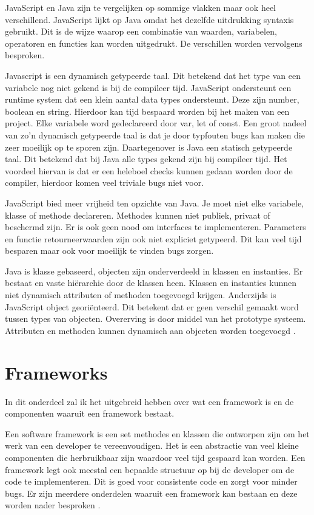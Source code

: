JavaScript en Java zijn te vergelijken op sommige vlakken maar ook heel verschillend. JavaScript lijkt op Java omdat het dezelfde uitdrukking syntaxis gebruikt. Dit is de wijze waarop een combinatie van waarden, variabelen, operatoren en functies kan worden uitgedrukt. De verschillen worden vervolgens besproken.

Javascript is een dynamisch getypeerde taal. Dit betekend dat het type van een variabele nog niet gekend is bij de compileer tijd. JavaScript ondersteunt een runtime system dat een klein aantal data types ondersteunt. Deze zijn number, boolean en string. Hierdoor kan tijd bespaard worden bij het maken van een project. Elke variabele word gedeclareerd door var, let of const. Een groot nadeel van zo’n dynamisch getypeerde taal is dat je door typfouten bugs kan maken die zeer moeilijk op te sporen zijn. Daartegenover is Java een statisch getypeerde taal. Dit betekend dat bij Java alle types gekend zijn bij compileer tijd. Het voordeel hiervan is dat er een heleboel checks kunnen gedaan worden door de compiler, hierdoor komen veel triviale bugs niet voor.

JavaScript bied meer vrijheid ten opzichte van Java. Je moet niet elke variabele, klasse of methode declareren. Methodes kunnen niet publiek, privaat of beschermd zijn. Er is ook geen nood om interfaces te implementeren. Parameters en functie retourneerwaarden zijn ook niet expliciet getypeerd. Dit kan veel tijd besparen maar ook voor moeilijk te vinden bugs zorgen.

Java is klasse gebaseerd, objecten zijn onderverdeeld in klassen en instanties. Er bestaat en vaste hiërarchie door de klassen heen. Klassen en instanties kunnen niet dynamisch attributen of methoden toegevoegd krijgen. Anderzijds is JavaScript object georiënteerd. Dit betekent dat er geen verschil gemaakt word tussen types van objecten. Overerving is door middel van het prototype systeem. Attributen en methoden kunnen dynamisch aan objecten worden toegevoegd \autocite{Introduction_2018}.

\section{Frameworks}
\label{sec:Frameworks}

In dit onderdeel zal ik het uitgebreid hebben over wat een framework is en de componenten waaruit een framework bestaat.

Een software framework is een set methodes en klassen die ontworpen zijn om het werk van een developer te vereenvoudigen. Het is een abstractie van veel kleine componenten die herbruikbaar zijn waardoor veel tijd gespaard kan worden. Een framework legt ook meestal een bepaalde structuur op bij de developer om de code te implementeren. Dit is goed voor consistente code en zorgt voor minder bugs. Er zijn meerdere onderdelen waaruit een framework kan bestaan en deze worden nader besproken \autocite{clifton_what_2003} \autocite{eskelin_software_2001}.

